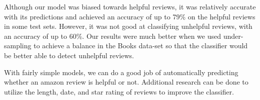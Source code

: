 \documentclass[11pt]{article}
\begin{document}
Although our model was biased towards helpful reviews, it was relatively accurate with its predictions and achieved an accuracy of up to 79\% on the helpful reviews in some test sets. However, it was not good at classifying unhelpful reviews, with an accuracy of up to 60\%. Our results were much better when we used under-sampling to achieve a balance in the Books data-set so that the classifier would be better able to detect unhelpful reviews. 

With fairly simple models, we can do a good job of automatically predicting whether an amazon review is helpful or not. Additional research can be done to utilize the length, date, and star rating of reviews to improve the classifier. 
\end{document}
